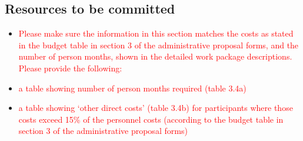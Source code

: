 \documentclass[12pt, a4paper]{article} %
\begin{document}
  \subsection{Resources to be committed}
 
  \begin{itemize}
  \item \textcolor{red}{Please make sure the information in this
      section matches the costs as stated in the budget table in
      section 3 of the administrative proposal forms, and the number
      of person months, shown in the detailed work package
      descriptions.  Please provide the following:}
 \item \textcolor{red}{a table showing number of person months required
    (table 3.4a)}
  \item \textcolor{red}{a table showing ‘other direct costs’ (table
      3.4b) for participants where those costs exceed 15\% of the
      personnel costs (according to the budget table in section 3 of
      the administrative proposal forms)}
\end{itemize}
\end{document}
